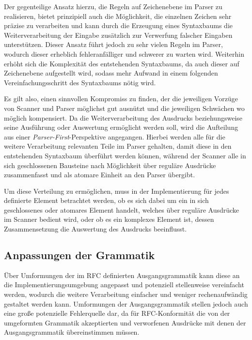 \documentclass[oneside]{ausarbeitung}
\begin{document}
Der gegenteilige Ansatz hierzu, die Regeln auf Zeichenebene im Parser zu realisieren, bietet prinzipiell auch die Möglichkeit, die einzelnen Zeichen sehr präzise zu verarbeiten und kann durch die Erzeugung eines Syntaxbaums die Weiterverarbeitung der Eingabe zusätzlich zur Verwerfung falscher Eingaben unterstützen. Dieser Ansatz führt jedoch zu sehr vielen Regeln im Parser, wodurch dieser erheblich fehleranfälliger und schwerer zu warten wird. Weiterhin erhöht sich die Komplexität des entstehenden Syntaxbaums, da auch dieser auf Zeichenebene aufgestellt wird, sodass mehr Aufwand in einem folgenden Vereinfachungsschritt des Syntaxbaums nötig wird.
	
Es gilt also, einen sinnvollen Kompromiss zu finden, der die jeweiligen Vorzüge von Scanner und Parser möglichst gut ausnützt und die jeweiligen Schwächen wo möglich kompensiert. Da die Weiterverarbeitung des Ausdrucks beziehungsweise seine Ausführung oder Auswertung ermöglicht werden soll, wird die Aufteilung aus einer \textit{Parser-First}-Perspektive angegangen. Hierbei werden alle für die weitere Verarbeitung relevanten Teile im Parser gehalten, damit diese in den entstehenden Syntaxbaum überführt werden können, während der Scanner alle in sich geschlossenen Bausteine nach Möglichkeit über reguläre Ausdrücke zusammenfasst und als atomare Einheit an den Parser übergibt.
	
Um diese Verteilung zu ermöglichen, muss in der Implementierung für jedes definierte Element betrachtet werden, ob es sich dabei um ein in sich geschlossenes oder atomares Element handelt, welches über reguläre Ausdrücke im Scanner bedient wird, oder ob es ein komplexes Element ist, dessen Zusammensetzung die Auswertung des Ausdrucks beeinflusst.
		
	
	
\subsection{Anpassungen der Grammatik}
	
Über Umformungen der im RFC definierten Ausgangsgrammatik kann diese an die Implementierungsumgebung angepasst und potenziell stellenweise vereinfacht werden, wodurch die weitere Verarbeitung einfacher und weniger rechenaufwändig gestaltet werden kann. Umformungen der Ausgangsgrammatik stellen jedoch auch eine große potenzielle Fehlerquelle dar, da für RFC-Konformität die von der umgeformten Grammatik akzeptierten und verworfenen Ausdrücke mit denen der Ausgangsgrammatik übereinstimmen müssen.
	
\end{document}
